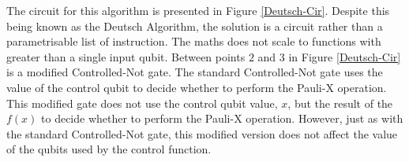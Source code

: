 The circuit for this algorithm is presented in Figure \ref{Deutsch-Cir}.
Despite this being known as the Deutsch Algorithm, the solution is a circuit rather than a parametrisable list of instruction.
The maths does not scale to functions with greater than a single input qubit.
Between points $2$ and $3$ in Figure \ref{Deutsch-Cir} is a modified Controlled-Not gate.
The standard Controlled-Not gate uses the value of the control qubit to decide whether to perform the Pauli-X operation.
This modified gate does not use the control qubit value, $x$, but the result of the $f(x)$ to decide whether to perform the Pauli-X operation.
However, just as with the standard Controlled-Not gate, this modified version does not affect the value of the qubits used by the control function.

% 
% 
